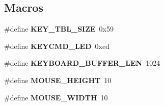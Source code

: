 \subsection*{Macros}
\begin{DoxyCompactItemize}
\item 
\hypertarget{group__keyboard__mousse_ga633080e9601cd863173f0eaf2490587b}{}\#define {\bfseries K\+E\+Y\+\_\+\+T\+B\+L\+\_\+\+S\+I\+Z\+E}~0x59\label{group__keyboard__mousse_ga633080e9601cd863173f0eaf2490587b}

\item 
\hypertarget{group__keyboard__mousse_ga50c9bc14d66361dbd6f833ff252ab427}{}\#define {\bfseries K\+E\+Y\+C\+M\+D\+\_\+\+L\+E\+D}~0xed\label{group__keyboard__mousse_ga50c9bc14d66361dbd6f833ff252ab427}

\item 
\hypertarget{group__keyboard__mousse_gac180efd451d9441e52db22ed03e34268}{}\#define {\bfseries K\+E\+Y\+B\+O\+A\+R\+D\+\_\+\+B\+U\+F\+F\+E\+R\+\_\+\+L\+E\+N}~1024\label{group__keyboard__mousse_gac180efd451d9441e52db22ed03e34268}

\item 
\hypertarget{group__keyboard__mousse_gacb18dcfa495d57f980ec36e86b89de88}{}\#define {\bfseries M\+O\+U\+S\+E\+\_\+\+H\+E\+I\+G\+H\+T}~10\label{group__keyboard__mousse_gacb18dcfa495d57f980ec36e86b89de88}

\item 
\hypertarget{group__keyboard__mousse_ga34b0ee6b88f41401e199b3f10e1d48d4}{}\#define {\bfseries M\+O\+U\+S\+E\+\_\+\+W\+I\+D\+T\+H}~10\label{group__keyboard__mousse_ga34b0ee6b88f41401e199b3f10e1d48d4}

\end{DoxyCompactItemize}
